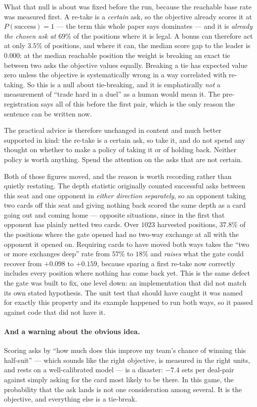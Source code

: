 \documentclass[11pt,a4paper]{article}
\begin{document}
What that null is about was fixed before the run, because the reachable base
rate was measured first. A re-take is a \emph{certain} ask, so the objective
already scores it at $P(\text{success}) = 1$ --- the term this whole paper says
dominates --- and it is \emph{already the chosen ask at $69\%$} of the positions
where it is legal. A bonus can therefore act at only $3.5\%$ of positions, and
where it can, the median score gap to the leader is $\mathbf{0.000}$: at the
median reachable position the weight is breaking an exact tie between two asks
the objective values equally. Breaking a tie has expected value zero unless the
objective is systematically wrong in a way correlated with re-taking. So this is
a null about tie-breaking, and it is emphatically \emph{not} a measurement of
``trade hard in a duel'' as a human would mean it. The pre-registration says all
of this before the first pair, which is the only reason the sentence can be
written now.

The practical advice is therefore unchanged in content and much better
supported in kind: the re-take is a certain ask, so take it, and do not spend
any thought on whether to make a policy of taking it or of holding back.
Neither policy is worth anything. Spend the attention on the asks that are not
certain.

Both of those figures moved, and the reason is worth recording rather than
quietly restating. The depth statistic originally counted successful asks
between this seat and one opponent in \emph{either direction separately}, so an
opponent taking two cards off this seat and giving nothing back scored the same
depth as a card going out and coming home --- opposite situations, since in the
first that opponent has plainly netted two cards. Over $1023$ harvested
positions, $37.8\%$ of the positions where the gate opened had no two-way
exchange at all with the opponent it opened on. Requiring cards to have moved
both ways takes the ``two or more exchanges deep'' rate from $57\%$ to $18\%$ and
\emph{raises} what the gate could recover from $+0.098$ to $+0.159$, because
sparing a first re-take now correctly includes every position where nothing has
come back yet. This is the same defect the gate was built to fix, one level down:
an implementation that did not match its own stated hypothesis. The unit test
that should have caught it was named for exactly this property and its example
happened to run both ways, so it passed against code that did not have it.

\paragraph{And a warning about the obvious idea.} Scoring asks by ``how much
does this improve my team's chance of winning this half-suit'' --- which sounds
like the right objective, is measured in the right units, and rests on a
well-calibrated model --- is a disaster: $-7.4$ sets per deal-pair against simply
asking for the card most likely to be there. In this game, the probability that
the ask lands is not one consideration among several. It is the objective, and
everything else is a tie-break.
\end{document}
